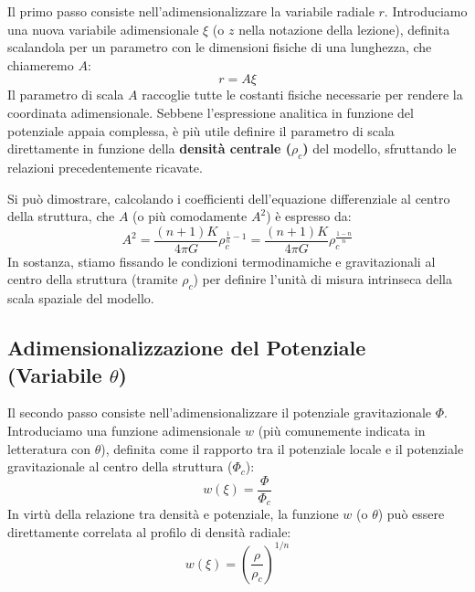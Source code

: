 Il primo passo consiste nell'adimensionalizzare la variabile radiale $r$. Introduciamo una nuova variabile adimensionale \textbf{$\xi$} (o $z$ nella notazione della lezione), definita scalandola per un parametro con le dimensioni fisiche di una lunghezza, che chiameremo $A$:
\begin{equation}
r = A \xi
\end{equation}
Il parametro di scala $A$ raccoglie tutte le costanti fisiche necessarie per rendere la coordinata adimensionale. Sebbene l'espressione analitica in funzione del potenziale appaia complessa, è più utile definire il parametro di scala direttamente in funzione della \textbf{densità centrale ($\rho_c$)} del modello, sfruttando le relazioni precedentemente ricavate.

Si può dimostrare, calcolando i coefficienti dell'equazione differenziale al centro della struttura, che $A$ (o più comodamente $A^2$) è espresso da:
\begin{equation}
A^2 = \frac{(n+1) K}{4\pi G} \rho_c^{\frac{1}{n} - 1} = \frac{(n+1) K}{4\pi G} \rho_c^{\frac{1-n}{n}}
\end{equation}
In sostanza, stiamo fissando le condizioni termodinamiche e gravitazionali al centro della struttura (tramite $\rho_c$) per definire l'unità di misura intrinseca della scala spaziale del modello.

\subsection{Adimensionalizzazione del Potenziale (Variabile $\theta$)}

Il secondo passo consiste nell'adimensionalizzare il potenziale gravitazionale $\Phi$. Introduciamo una funzione adimensionale \textbf{$w$} (più comunemente indicata in letteratura con $\theta$), definita come il rapporto tra il potenziale locale e il potenziale gravitazionale al centro della struttura ($\Phi_c$):
\begin{equation}
w(\xi) = \frac{\Phi}{\Phi_c}
\end{equation}
In virtù della relazione tra densità e potenziale, la funzione $w$ (o $\theta$) può essere direttamente correlata al profilo di densità radiale:
\begin{equation}
w(\xi) = \left( \frac{\rho}{\rho_c} \right)^{1/n}
\end{equation}

